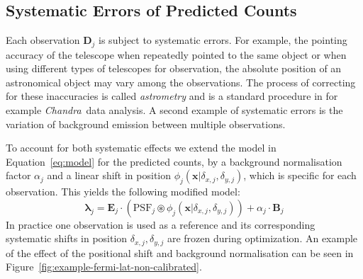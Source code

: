 \documentclass[twocolumn]{aastex631}
\newcommand{\chandra}{\textit{Chandra}~}
\begin{document}




    \subsection{Systematic Errors of Predicted Counts}
    Each observation $\mathbf{D}_j$ is subject to systematic errors. For example, the pointing accuracy of the telescope when repeatedly pointed to the same object or when using different types of telescopes for observation, the absolute position of an astronomical object may vary among the  observations. The process of correcting for these inaccuracies is called \textit{astrometry} and is a standard procedure in for example \chandra data analysis. A second example of systematic errors is the variation of background emission between multiple observations.
    
    To account for both systematic effects we extend the model in Equation~\ref{eq:model} for the predicted counts, by a background normalisation factor $\alpha_j$ and a linear shift in position $\phi_j(\mathbf{x}| \delta_{x,j}, \delta_{y,j})$, which is specific for each observation. This yields the following modified model:
    \begin{equation}
        \label{eq:model-npred-calibration}
        \mathbf{\lambda}_j = \mathbf{E}_j \cdot  \left(\mathrm{PSF}_j \circledast \phi_j(\mathbf{x}| \delta_{x,j}, \delta_{y,j})\right) + \alpha_j \cdot \mathbf{B}_j
    \end{equation}
    In practice one observation is used as a reference and its corresponding systematic shifts in position $\delta_{x,j}, \delta_{y,j}$ are frozen during optimization. An example of the effect of the positional shift and background normalisation can be seen in Figure~\ref{fig:example-fermi-lat-non-calibrated}.
\end{document}
